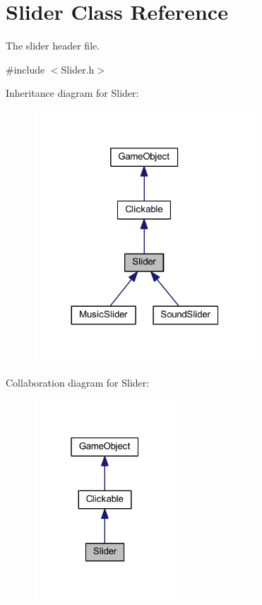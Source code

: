 \hypertarget{class_slider}{\section{Slider Class Reference}
\label{class_slider}
}


The slider header file.  




{\ttfamily \#include $<$Slider.\+h$>$}



Inheritance diagram for Slider\+:
\nopagebreak
\begin{figure}[H]
\begin{center}
\leavevmode
\includegraphics[width=236pt]{class_slider__inherit__graph}
\end{center}
\end{figure}


Collaboration diagram for Slider\+:\nopagebreak
\begin{figure}[H]
\begin{center}
\leavevmode
\includegraphics[width=151pt]{class_slider__coll__graph}
\end{center}
\end{figure}
